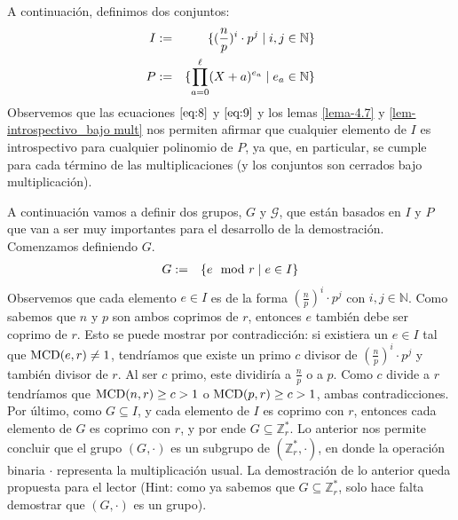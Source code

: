 	A continuación, definimos dos conjuntos:
	\begin{eqnarray}
		I&:=&\{(\frac{n}{p})^i\cdot p^j \mid i,j\in \mathbb{N}\}\nonumber\\
		P&:=&\{\prod_{a=0}^{\ell }(X+a)^{e_a}\mid e_a\in \mathbb{N}\}\nonumber	
	\end{eqnarray}
	Observemos que las ecuaciones $\eqref{eq:8}$ y $\eqref{eq:9}$ y los lemas \ref{lema-4.7} y \ref{lem-introspectivo_bajo mult} nos permiten afirmar que cualquier elemento de $I$ es introspectivo para cualquier polinomio de $P$, ya que, en particular, se cumple para cada término de las multiplicaciones (y los conjuntos son cerrados bajo multiplicación).
	
	A continuación vamos a definir dos grupos, $G$ y $\mathcal{G}$, que están basados en $I$ y $P$ que van a ser muy importantes para el desarrollo de la demostración. Comenzamos definiendo $G$.
		\begin{eqnarray}
			G&:=& \{e\mod r\mid e\in I\}\nonumber
		\end{eqnarray}
	Observemos que cada elemento $e\in I$ es de la forma $(\frac{n}{p})^i\cdot p^j$ con $i,j\in \mathbb{N}$. Como sabemos que $n$ y $p$ son ambos coprimos de $r$, entonces $e$ también debe ser coprimo de $r$.
	Esto se puede mostrar por contradicción: si existiera un $e\in I$ tal que ${\rm MCD}(e,r)\neq 1$, tendrí­amos que existe un primo $c$ divisor de $(\frac{n}{p})^i\cdot p^j$ y también divisor de $r$. Al ser $c$ primo, este dividiría a $\frac{n}{p}$ o a $p$. Como $c$ divide a $r$ tendríamos que ${\rm MCD}(n,r)\geq c>1$ o ${\rm MCD}(p,r)\geq c>1$, ambas contradicciones.
	 Por último, como $G\subseteq I$, y cada elemento de $I$ es coprimo con $r$, entonces cada elemento de $G$ es coprimo con $r$, y por ende $G\subseteq \mathbb{Z}_r^*$. Lo anterior nos permite concluir que el grupo $(G,\cdot)$ es un subgrupo de $(\mathbb{Z}_r^*,\cdot)$, en donde la operación binaria $\cdot$ representa la multiplicación usual. La demostración de lo anterior queda propuesta para el lector (Hint: como ya sabemos que $G\subseteq \mathbb{Z}_r^*$, solo hace falta demostrar que $(G,\cdot)$ es un grupo).	
